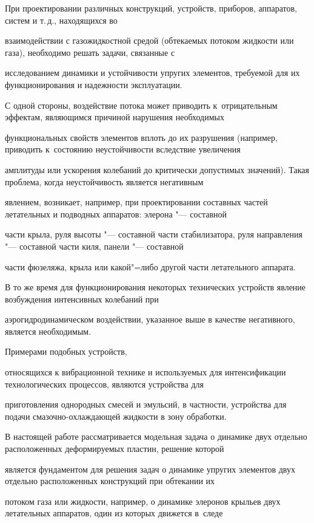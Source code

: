  При проектировании различных конструкций, устройств, приборов, аппаратов, систем и т.\,д., находящихся во

взаимодействии с газожидкостной средой (обтекаемых потоком жидкости или газа), необходимо решать задачи, связанные с

исследованием динамики и устойчивости упругих элементов, требуемой для их функционирования и надежности эксплуатации.



С одной стороны, воздействие потока может приводить к~отрицательным эффектам, являющимся причиной нарушения необходимых

функциональных свойств элементов вплоть до их разрушения (например, приводить к~состоянию неустойчивости вследствие  увеличения

амплитуды или ускорения колебаний до критически допустимых значений). Такая проблема, когда неустойчивость является негативным

явлением, возникает, например, при проектировании составных частей летательных и подводных аппаратов: элерона "--- составной

части крыла, руля высоты "--- составной части стабилизатора, руля направления "--- составной части киля, панели "--- составной

части фюзеляжа, крыла или какой"=либо другой части летательного аппарата.



В то же время для функционирования некоторых технических устройств явление возбуждения интенсивных колебаний при

аэрогидродинамическом воздействии, указанное выше в качестве негативного, является необходимым. 

Примерами подобных устройств,

относящихся к вибрационной технике и  используемых для интенсификации технологических процессов, являются уст\-ройства для

приготовления однородных смесей и эмульсий, в частности, уст\-ройства для подачи смазочно-охлаждающей жидкости в зону обработки.



В настоящей работе рассматривается модельная задача о динамике двух отдельно расположенных деформируемых пластин, решение которой

является фундаментом для решения задач о динамике упругих элементов двух отдельно расположенных конструкций при обтекании их

потоком газа или жидкости, например, о динамике элеронов крыльев двух летательных аппаратов, один из которых движется в~следе

